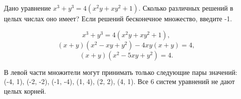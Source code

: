 
Дано уравнение $x^3+y^3=4(x^2y+xy^2+1)$. Сколько различных решений в целых числах оно имеет?
Если решений бесконечное множество, введите -1.

\soultionSection

$$x^3 + y^3 = 4(x^2y + xy^2 + 1),$$
$$(x+y)(x^2-xy+y^2) - 4xy(x + y) = 4,$$
$$(x+y)(x^2-5xy+y^2) = 4.$$

В левой части множители могут принимать только следующие пары значений: (-4, 1), (-2, -2), (-1, -4), (1, 4), (2, 2), (4, 1). Все 6 систем уравнений не дают целых корней.

